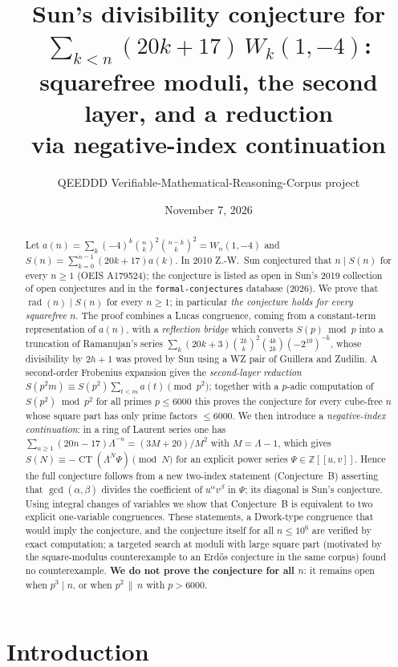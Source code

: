 \documentclass[11pt]{amsart}
\title[Sun's conjecture for $\sum(20k+17)W_k(1,-4)$]{Sun's divisibility conjecture for
$\sum_{k<n}(20k+17)\,W_k(1,-4)$:\\ squarefree moduli, the second layer, and a reduction\\
via negative-index continuation}
\author{QEEDDD Verifiable-Mathematical-Reasoning-Corpus project}
\date{November 7, 2026}
\theoremstyle{definition}
\newcommand{\Z}{\mathbb{Z}}
\newcommand{\CT}{\operatorname{CT}}
\newcommand{\rad}{\operatorname{rad}}
\begin{document}
\begin{abstract}
Let $a(n)=\sum_{k}(-4)^k\binom nk^2\binom{n-k}k^2=W_n(1,-4)$ and
$S(n)=\sum_{k=0}^{n-1}(20k+17)a(k)$.
In 2010 Z.-W.~Sun conjectured that $n\mid S(n)$ for every $n\ge 1$ (OEIS A179524); the conjecture
is listed as open in Sun's 2019 collection of open conjectures and in the
\texttt{formal-conjectures} database (2026).
We prove that $\rad(n)\mid S(n)$ for every $n\ge1$; in particular \emph{the conjecture holds for
every squarefree $n$}. The proof combines a Lucas congruence, coming from a constant-term
representation of $a(n)$, with a \emph{reflection bridge} which converts $S(p)\bmod p$ into a
truncation of Ramanujan's series $\sum_k(20k+3)\binom{2k}k^2\binom{4k}{2k}(-2^{10})^{-k}$, whose
divisibility by $2h+1$ was proved by Sun using a WZ pair of Guillera and Zudilin.
A second-order Frobenius expansion gives the \emph{second-layer reduction}
$S(p^2m)\equiv S(p^2)\sum_{t<m}a(t)\pmod{p^2}$; together with a $p$-adic computation of
$S(p^2)\bmod p^2$ for all primes $p\le 6000$ this proves the conjecture for every cube-free $n$
whose square part has only prime factors $\le6000$.
We then introduce a \emph{negative-index continuation}: in a ring of Laurent series one has
$\sum_{n\ge1}(20n-17)\Lambda^{-n}=(3M+20)/M^2$ with $M=\Lambda-1$, which gives
$S(N)\equiv-\CT(\Lambda^N\Psi)\pmod N$ for an explicit power series $\Psi\in\Z[[u,v]]$.
Hence the full conjecture follows from a new two-index statement (Conjecture~B) asserting that
$\gcd(\alpha,\beta)$ divides the coefficient of $u^\alpha v^\beta$ in $\Psi$; its diagonal is Sun's
conjecture. Using integral changes of variables we show that Conjecture~B is equivalent to two
explicit one-variable congruences. These statements, a Dwork-type congruence that would imply the
conjecture, and the conjecture itself for all $n\le 10^6$ are verified by exact computation; a targeted search
at moduli with large square part (motivated by the square-modulus counterexample to an Erd\H{o}s
conjecture in the same corpus) found no counterexample.
\textbf{We do not prove the conjecture for all $n$}: it remains open when $p^3\mid n$, or when
$p^2\,\|\,n$ with $p>6000$.
\end{abstract}

\maketitle

\section{Introduction}
\end{document}
